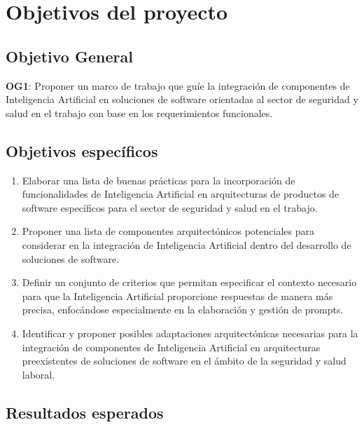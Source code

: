 \section{Objetivos del proyecto}
\subsection{Objetivo General}
\textbf{OG1}: Proponer un marco de trabajo que guíe la integración de componentes de Inteligencia Artificial en soluciones de software orientadas al sector de seguridad y salud en el trabajo con base en los requerimientos funcionales.


\subsection{Objetivos específicos}
\begin{enumerate}[label=\textbf{OE\arabic*:}]
    \item Elaborar una lista de buenas prácticas para la incorporación de funcionalidades de Inteligencia Artificial en arquitecturas de productos de software específicos para el sector de seguridad y salud en el trabajo.
    \item Proponer una lista de componentes arquitectónicos potenciales para considerar en la integración de Inteligencia Artificial dentro del desarrollo de soluciones de software.
    \item Definir un conjunto de criterios que permitan especificar el contexto necesario para que la Inteligencia Artificial proporcione respuestas de manera más precisa, enfocándose especialmente en la elaboración y gestión de prompts.
    \item Identificar y proponer posibles adaptaciones arquitectónicas necesarias para la integración de componentes de Inteligencia Artificial en arquitecturas preexistentes de soluciones de software en el ámbito de la seguridad y salud laboral.
\end{enumerate}


\subsection{Resultados esperados}

